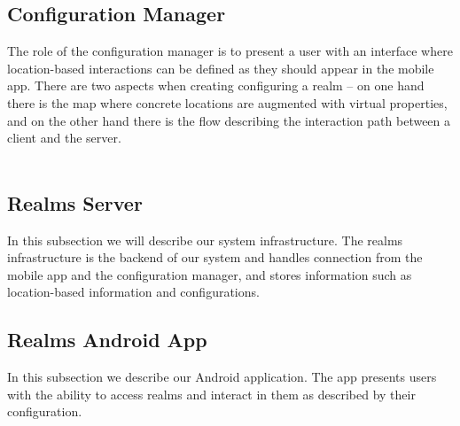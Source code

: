 \subsection{Configuration Manager} %
\label{sub:configuration_manager}
The role of the configuration manager is to present a user with an interface where location-based interactions can be defined as they should appear in the mobile app. There are two aspects when creating configuring a realm -- on one hand there is the map where concrete locations are augmented with virtual properties, and on the other hand there is the flow describing the interaction path between a client and the server.
\\\\



\subsection{Realms Server} %
\label{sub:realms_infrastructure}
In this subsection we will describe our system infrastructure. The realms infrastructure is the backend of our system and handles connection from the mobile app and the configuration manager, and stores information such as location-based information and configurations.

\subsection{Realms Android App} %
\label{sub:realms_android_app}
In this subsection we describe our Android application. The app presents users with the ability to access realms and interact in them as described by their configuration.
